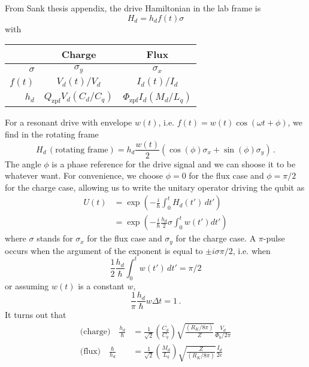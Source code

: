 From Sank thesis appendix, the drive Hamiltonian in the lab frame is
\begin{equation*}
  H_d = h_d f(t) \sigma
\end{equation*}
with
\begin{center}
  \begin{tabular}{|r|c|c|}
    \hline
    & \textbf{Charge} & \textbf{Flux} \\
    \hline \hline
    $\sigma$ & $\sigma_y$ & $\sigma_x$ \\
    \hline
    $f(t)$ & $V_d(t)/V_d$ & $I_d(t) / I_d$ \\
    \hline
    $h_d$ & $Q_\text{zpf} V_d(C_d/C_q)$ & $\Phi_\text{zpf} I_d (M_d/L_q)$ \\
    \hline
  \end{tabular}
\end{center}
For a resonant drive with envelope $w(t)$, i.e. $f(t) = w(t) \cos(\omega t + \phi)$, we find in the rotating frame
\begin{equation*}
  H_d \, (\text{rotating frame}) = h_d \frac{w(t)}{2} \left( \cos(\phi) \sigma_x + \sin(\phi) \sigma_y \right) \, .
\end{equation*}
The angle $\phi$ is a phase reference for the drive signal and we can shoose it to be whatever want.
For convenience, we choose $\phi=0$ for the flux case and $\phi=\pi/2$ for the charge case, allowing us to write the unitary operator driving the qubit as
\begin{align*}
  U(t)
  &= \exp \left( -\frac{i}{\hbar} \int_0^t H_d(t') \, dt' \right) \\
  &= \exp \left( -\frac{i}{\hbar} \frac{h_d}{2} \sigma \int_0^t w(t') dt' \right)
\end{align*}
where $\sigma$ stands for $\sigma_x$ for the flux case and $\sigma_y$ for the charge case.
A $\pi$-pulse occurs when the argument of the exponent is equal to $\pm i \sigma \pi / 2$, i.e. when
\begin{equation*}
  \frac{1}{2} \frac{h_d}{\hbar} \int_0^t w(t') \, dt' = \pi / 2
\end{equation*}
or assuming $w(t)$ is a constant $w$,
\begin{equation}
  \frac{1}{\pi} \frac{h_d}{\hbar} w \Delta t = 1 \, .
\end{equation}
It turns out that
\begin{align*}
  \text{(charge)} \quad \frac{h_d}{\hbar} &=
  \frac{1}{\sqrt{2}} \left(\frac{C_d}{C_q} \right) \sqrt{\frac{(R_K / 8\pi)}{Z}} \frac{V_d}{\Phi_0/2\pi} \\
  \text{(flux)} \quad \frac{\hbar}{h_d} &=
  \frac{1}{\sqrt{2}} \left( \frac{M_d}{L_q} \right) \sqrt{\frac{Z}{(R_K/8\pi)}} \frac{I_d}{2e}
\end{align*}
